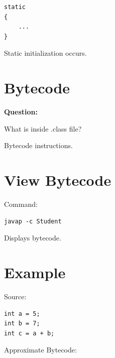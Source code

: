 \documentclass[11pt,a4paper]{book}
\begin{document}
\begin{verbatim} 
static
{
    ...
}
\end{verbatim}


Static initialization occurs.


\section{Bytecode}

\textbf{Question:}


What is inside .class file?


Bytecode instructions.


\section{View Bytecode}

Command:

\begin{verbatim} 
javap -c Student
\end{verbatim}


Displays bytecode.


\section{Example}

Source:

\begin{verbatim} 
int a = 5;
int b = 7;
int c = a + b;
\end{verbatim}


Approximate Bytecode:
\end{document}
